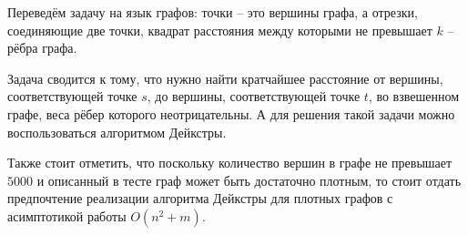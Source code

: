 \solutionSection

Переведём задачу на язык графов:
точки -- это вершины графа,
а отрезки, соединяющие две точки, квадрат расстояния между которыми не превышает $k$ -- рёбра графа.

Задача сводится к тому, что нужно найти кратчайшее расстояние от вершины, соответствующей точке $s$, до вершины, соответствующей точке $t$, во взвешенном графе, веса рёбер которого неотрицательны. А для решения такой задачи можно воспользоваться алгоритмом Дейкстры.

Также стоит отметить, что поскольку количество вершин в графе не превышает $5000$ и описанный в тесте граф может быть достаточно плотным, то стоит отдать предпочтение реализации алгоритма Дейкстры для плотных графов с асимптотикой работы $O(n^2 + m)$.

\codeExample

{}